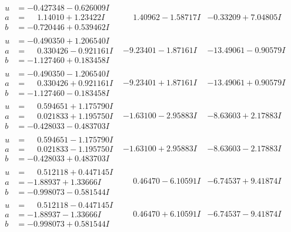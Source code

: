\documentclass[1p]{elsarticle_modified}
\theoremstyle{definition}
\begin{document}
$$\begin{array}{c|c|c}
\begin{aligned}
u &= -0.427348 - 0.626009 I \\
a &= \phantom{-}1.14010 + 1.23422 I \\
b &= -0.720446 + 0.539462 I\end{aligned}
 & \phantom{-}1.40962 - 1.58717 I & -0.33209 + 7.04805 I \\ \hline\begin{aligned}
u &= -0.490350 + 1.206540 I \\
a &= \phantom{-}0.330426 - 0.921161 I \\
b &= -1.127460 + 0.183458 I\end{aligned}
 & -9.23401 - 1.87161 I & -13.49061 - 0.90579 I \\ \hline\begin{aligned}
u &= -0.490350 - 1.206540 I \\
a &= \phantom{-}0.330426 + 0.921161 I \\
b &= -1.127460 - 0.183458 I\end{aligned}
 & -9.23401 + 1.87161 I & -13.49061 + 0.90579 I \\ \hline\begin{aligned}
u &= \phantom{-}0.594651 + 1.175790 I \\
a &= \phantom{-}0.021833 + 1.195750 I \\
b &= -0.428033 - 0.483703 I\end{aligned}
 & -1.63100 - 2.95883 I & -8.63603 + 2.17883 I \\ \hline\begin{aligned}
u &= \phantom{-}0.594651 - 1.175790 I \\
a &= \phantom{-}0.021833 - 1.195750 I \\
b &= -0.428033 + 0.483703 I\end{aligned}
 & -1.63100 + 2.95883 I & -8.63603 - 2.17883 I \\ \hline\begin{aligned}
u &= \phantom{-}0.512118 + 0.447145 I \\
a &= -1.88937 + 1.33666 I \\
b &= -0.998073 - 0.581544 I\end{aligned}
 & \phantom{-}0.46470 - 6.10591 I & -6.74537 + 9.41874 I \\ \hline\begin{aligned}
u &= \phantom{-}0.512118 - 0.447145 I \\
a &= -1.88937 - 1.33666 I \\
b &= -0.998073 + 0.581544 I\end{aligned}
 & \phantom{-}0.46470 + 6.10591 I & -6.74537 - 9.41874 I \\ \hline\begin{aligned}

\end{aligned}
\end{array}$$
\end{document}
